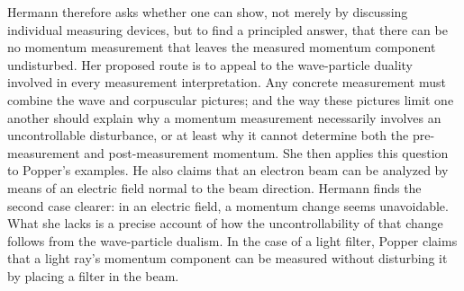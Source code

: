 




Hermann therefore asks whether one can show, not merely by discussing individual measuring devices, but to find a principled answer, that there can be no momentum measurement that leaves the measured momentum component undisturbed. Her proposed route is to appeal to the wave-particle duality involved in every measurement interpretation. Any concrete measurement must combine the wave and corpuscular pictures; and the way these pictures limit one another should explain why a momentum measurement necessarily involves an uncontrollable disturbance, or at least why it cannot determine both the pre-measurement and post-measurement momentum. She then applies this question to Popper’s examples. He also claims that an electron beam can be analyzed by means of an electric field normal to the beam direction. Hermann finds the second case clearer: in an electric field, a momentum change seems unavoidable. What she lacks is a precise account of how the uncontrollability of that change follows from the wave-particle dualism. In the case of a light filter, Popper claims that a light ray’s momentum component can be measured without disturbing it by placing a filter in the beam.

